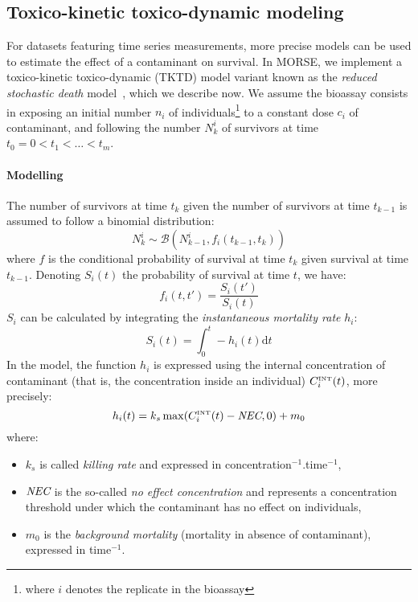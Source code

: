 \documentclass{article}
\begin{document}
\subsection{Toxico-kinetic toxico-dynamic modeling}

For datasets featuring time series measurements, more precise models
can be used to estimate the effect of a contaminant on survival. In
MORSE, we implement a toxico-kinetic toxico-dynamic (TKTD) model
variant known as the \emph{reduced stochastic death}
model~\cite{nyman2012}, which we describe now. We assume the bioassay
consists in exposing an initial number $n_i$ of individuals\footnote{where $i$
  denotes the replicate in the bioassay} to a
constant dose $c_i$ of contaminant, and following the number $N^i_k$
of survivors at time $t_0 = 0 < t_1 < \dots < t_m$.

\newcommand*{\diffdchar}{\mathrm{d}}    %
\newcommand*{\dd}{\mathop{\diffdchar\!}}
\newcommand*{\NEC}{\mbox{\it NEC}}
\newcommand*{\Cint}{C^{\mbox{\tiny INT}}}
\newcommand*{\tNEC}{t^{\tiny \NEC}}


\paragraph{Modelling} The number of survivors at time $t_k$ given the
number of survivors at time $t_{k-1}$ is assumed to follow a binomial
distribution:
$$
N^i_k \sim \mathcal{B}(N^i_{k-1}, f_i(t_{k-1}, t_k))
$$
where $f$ is the conditional probability of survival at time $t_k$
given survival at time $t_{k-1}$. Denoting $S_i(t)$ the probability
of survival at time $t$, we have:
$$
f_i(t,t') = \frac{S_i(t')}{S_i(t)}
$$
$S_i$ can be calculated by integrating the \emph{instantaneous mortality
rate} $h_i$:
\begin{equation}
  \label{eq:survivaldef}
  S_i(t) = \int_0^t - h_i(t)\mbox{d}t
\end{equation}
In the model, the function $h_i$ is expressed using the internal
concentration of contaminant (that is, the concentration inside an
individual) $\Cint_i(t)$, more precisely:
$$
h_i(t) = k_s \max(\Cint_i(t) - \NEC, 0) + m_0
$$
where:
\begin{itemize}
\item $k_s$ is called \emph{killing rate} and expressed in
  concentration$^{-1}$.time$^{-1}$,
\item $\NEC$ is the so-called \emph{no effect concentration} and
  represents a concentration threshold under which the contaminant has
  no effect on individuals,
\item $m_0$ is the \emph{background mortality} (mortality in absence of
  contaminant), expressed in time$^{-1}$.
\end{itemize}
\end{document}
